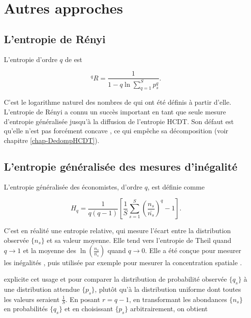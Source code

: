 \documentclass[
  11pt,
  french,
  a4paper,
  extrafontsizes,onecolumn,openright
  ]{memoir}
\begin{document}
\section{Autres approches}\label{autres-approches}

\subsection{L'entropie de Rényi}\label{lentropie-de-ruxe9nyi}

L'entropie d'ordre \(q\) de \textcite{Renyi1961} est

\begin{equation}
  \label{eq:Renyi}
  ^{q}\!R =\frac{1}{1-q\ln\sum^S_{q=1}{p^q_s}}.
\end{equation}

C'est le logarithme naturel des nombres de \textcite{Hill1973} qui ont été définis à partir d'elle.
L'entropie de Rényi a connu un succès important en tant que seule mesure d'entropie généralisée jusqu'à la diffusion de l'entropie HCDT.
Son défaut est qu'elle n'est pas forcément concave \autocite{Beck2009}, ce qui empêche sa décomposition (voir chapitre \ref{chap-DedompHCDT}).

\subsection{L'entropie généralisée des mesures d'inégalité}\label{lentropie-guxe9nuxe9ralisuxe9e-des-mesures-dinuxe9galituxe9}

L'entropie généralisée des économistes, d'ordre \(q\), est définie comme

\begin{equation}
  \label{eq:HqEco}
  H_q = \frac{1}{q\left(q-1\right)} \left[\frac{1}{S}\sum^S_{s=1}{\left(\frac{n_s}{\bar{n_s}}\right)^{q}}-1\right].
\end{equation}

C'est en réalité une entropie relative, qui mesure l'écart entre la distribution observée \(\{n_s\}\) et sa valeur moyenne. Elle tend vers l'entropie de Theil quand \(q \to 1\) et la moyenne des \(\ln(\frac{n_s}{\bar{n_s}})\) quand \(q \to 0\).
Elle a été conçue pour mesurer les inégalités \autocite{Cowell2000}, puis utilisée par exemple pour mesurer la concentration spatiale \autocite{Brulhart2005}.

\textcite{Maasoumi1993} explicite cet usage et pour comparer la distribution de probabilité observée \(\{q_s\}\) à une distribution attendue \(\{p_s\}\), plutôt qu'à la distribution uniforme dont toutes les valeurs seraient \(\frac{1}{S}\). En posant \(r=q-1\), en transformant les abondances \(\{n_s\}\) en probabilités \(\{q_s\}\) et en choisissant \(\{p_s\}\) arbitrairement, on obtient
\end{document}
